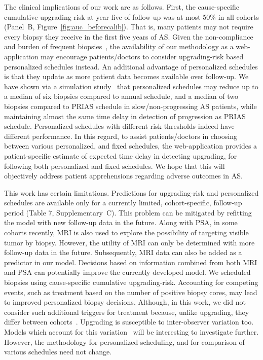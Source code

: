 The clinical implications of our work are as follows. First, the cause-specific cumulative upgrading-risk at year five of follow-up was at most 50\% in all cohorts (Panel~B, Figure~\ref{fig:auc_beforecalib}). That is, many patients may not require every biopsy they receive in the first five years of AS. Given the non-compliance and burden of frequent biopsies~\citep{bokhorst2015compliance}, the availability of our methodology as a web-application may encourage patients/doctors to consider upgrading-risk based personalized schedules instead. An additional advantage of personalized schedules is that they update as more patient data becomes available over follow-up. We have shown via a simulation study~\citep{tomer2019personalized} that personalized schedules may reduce up to a median of six biopsies compared to annual schedule, and a median of two biopsies compared to PRIAS schedule in slow/non-progressing AS patients, while maintaining almost the same time delay in detection of progression as PRIAS schedule. Personalized schedules with different risk thresholds indeed have different performance. In this regard, to assist patients/doctors in choosing between various personalized, and fixed schedules, the web-application provides a patient-specific estimate of expected time delay in detecting upgrading, for following both personalized and fixed schedules. We hope that this will objectively address patient apprehensions regarding adverse outcomes in AS.

This work has certain limitations. Predictions for upgrading-risk and personalized schedules are available only for a currently limited, cohort-specific, follow-up period (Table 7, Supplementary~C). This problem can be mitigated by refitting the model with new follow-up data in the future. Along with PSA, in some cohorts recently, MRI is also used to explore the possibility of targeting visible tumor by biopsy. However, the utility of MRI can only be determined with more follow-up data in the future. Subsequently, MRI data can also be added as a predictor in our model. Decisions based on information combined from both MRI and PSA can potentially improve the currently developed model. We scheduled biopsies using cause-specific cumulative upgrading-risk. Accounting for competing events, such as treatment based on the number of positive biopsy cores, may lead to improved personalized biopsy decisions. Although, in this work, we did not consider such additional triggers for treatment because, unlike upgrading, they differ between cohorts~\citep{nieboer2018active}. Upgrading is susceptible to inter-observer variation too. Models which account for this variation~\citep{coley2017prediction,balasubramanian2003estimation} will be interesting to investigate further. However, the methodology for personalized scheduling, and for comparison of various schedules need not change.